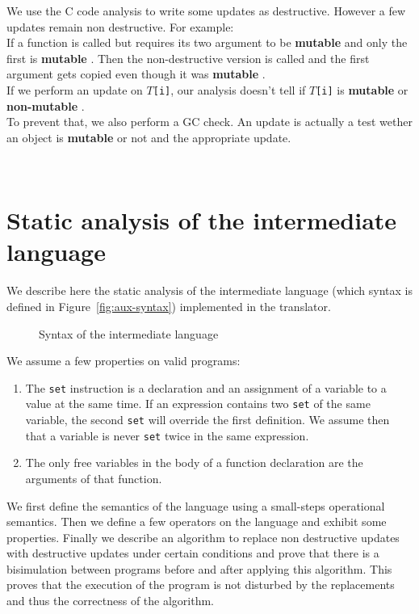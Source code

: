 \documentclass[12pt,a4paper]{article}
\newcommand{\cl}[1]{\texttt{#1}}
\newcommand{\mut}{  \textbf{ mutable } }
\newcommand{\nmut}{ \textbf{ non-mutable } }
\begin{document}
We use the C code analysis to write some updates as destructive. However a few updates remain non destructive. For example:\\

If a function is called but requires its two argument to be \mut  and only the first is \mut. Then the non-destructive version is called and the first argument gets copied even though it was \mut.\\

If we perform an update on \cl{$T$[i]}, our analysis doesn't tell if \cl{$T$[i]} is \mut or \nmut.\\

To prevent that, we also perform a GC check. An update is actually a test wether an object is \mut or not and the appropriate update.






\newpage
\
\newpage

\section{Static analysis of the intermediate language}
\label{sec:StaticAnal}

We describe here the static analysis of the intermediate language (which syntax is defined in Figure~\ref{fig:aux-syntax}) implemented in the translator.

\begin{figure}[!ht]

\caption{Syntax of the intermediate language}
\end{figure}

We assume a few properties on valid programs:
\begin{enumerate}
\item The \cl{set} instruction is a declaration and an assignment of a variable to a value at the same time. If an expression contains two \cl{set} of the same variable, the second \cl{set} will override the first definition. We assume then that a variable is never \cl{set} twice in the same expression.
\item The only free variables in the body of a function declaration are the arguments of that function.
\end{enumerate}

We first define the semantics of the language using a small-steps operational semantics. Then we define a few operators on the language and exhibit some properties.
Finally we describe an algorithm to replace non destructive updates with destructive updates under certain conditions and prove that there is a bisimulation between programs before and after applying this algorithm. This proves that the execution of the program is not disturbed by the replacements and thus the correctness of the algorithm.
\end{document}

